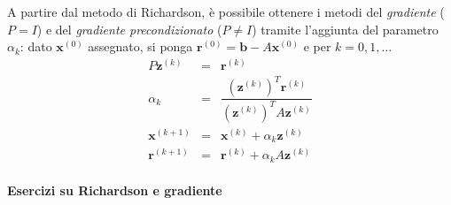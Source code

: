 \highspace
A partire dal metodo di Richardson, è possibile ottenere i metodi del \emph{gradiente} ($P = I$) e del \emph{gradiente precondizionato} ($P \ne I$) tramite l'aggiunta del parametro $\alpha_{k}$: dato $\mathbf{x}^{\left(0\right)}$ assegnato, si ponga $\mathbf{r}^{\left(0\right)} = \mathbf{b} - A\mathbf{x}^{\left(0\right)}$ e per $k = 0, 1, \dots$
\begin{equation}
    \begin{array}{rcl}
        P\mathbf{z}^{\left(k\right)} &=& \mathbf{r}^{\left(k\right)} \\ [.5em]
        \alpha_{k} &=& \dfrac{
            \left(\mathbf{z}^{\left(k\right)}\right)^{T} \mathbf{r}^{\left(k\right)}
        }{
            \left(\mathbf{z}^{\left(k\right)}\right)^{T} A\mathbf{z}^{\left(k\right)}
        } \\ [2em]
        \mathbf{x}^{\left(k+1\right)} &=& \mathbf{x}^{\left(k\right)} + \alpha_{k} \mathbf{z}^{\left(k\right)} \\ [1em]
        \mathbf{r}^{\left(k+1\right)} &=& \mathbf{r}^{\left(k\right)} + \alpha_{k}A\mathbf{z}^{\left(k\right)}
    \end{array}
\end{equation}

\newpage

\paragraph{Esercizi su Richardson e gradiente}

